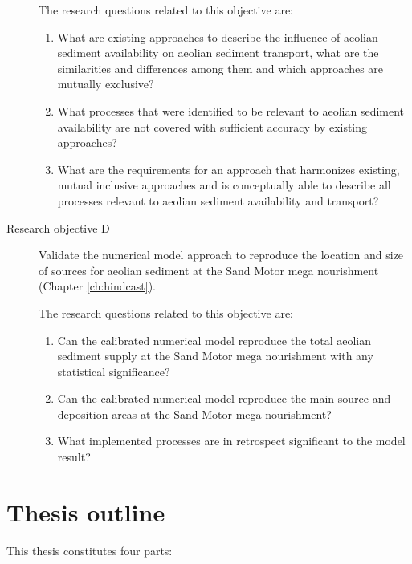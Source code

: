\begin{description}
  \medskip

  The research questions related to this objective are:

  \begin{enumerate}[{C}1]
  \item What are existing approaches to describe the
    influence of aeolian sediment availability on aeolian sediment
    transport, what are the similarities and differences among them
    and which approaches are mutually exclusive?
  \item What processes that were identified to be
    relevant to aeolian sediment availability are not covered with
    sufficient accuracy by existing approaches?
  \item What are the requirements for an approach that
    harmonizes existing, mutual inclusive approaches and is
    conceptually able to describe all processes relevant to aeolian
    sediment availability and transport?
  \end{enumerate}

  \bigskip

\item[Research objective D] Validate the numerical model approach to
  reproduce the location and size of sources for aeolian sediment at
  the Sand Motor mega nourishment (Chapter \ref{ch:hindcast}).

  \medskip

  The research questions related to this objective are:

  \begin{enumerate}[{D}1]
  \item Can the calibrated numerical model reproduce the
    total aeolian sediment supply at the Sand Motor mega nourishment
    with any statistical significance?
  \item Can the calibrated numerical model reproduce the
    main source and deposition areas at the Sand Motor mega
    nourishment?
  \item What implemented processes are in retrospect
    significant to the model result?
  \end{enumerate}
\end{description}

\bigskip

\section{Thesis outline}

This thesis constitutes four parts:

